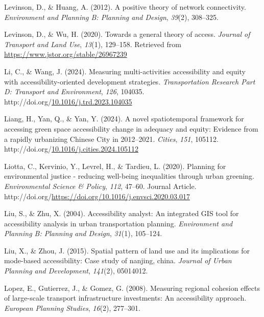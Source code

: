 \documentclass[
11pt, %
oneside, %
english, %
singlespacing, %
]{macthesis} %
\newlength{\cslhangindent}
\newenvironment{CSLReferences}[2] %
{\begin{list}{}{%
	\setlength{\itemindent}{0pt}
	\setlength{\leftmargin}{0pt}
	\setlength{\parsep}{0pt}
	\ifodd #1
	\setlength{\leftmargin}{\cslhangindent}
	\setlength{\itemindent}{-1\cslhangindent}
	\fi
	\setlength{\itemsep}{#2\baselineskip}}}
{\end{list}}
\begin{document}
\begin{CSLReferences}{1}{0}
Levinson, D., \& Huang, A. (2012). A positive theory of network connectivity. \emph{Environment and Planning B: Planning and Design}, \emph{39}(2), 308--325.

Levinson, D., \& Wu, H. (2020). Towards a general theory of access. \emph{Journal of Transport and Land Use}, \emph{13}(1), 129--158. Retrieved from \url{https://www.jstor.org/stable/26967239}

Li, C., \& Wang, J. (2024). Measuring multi-activities accessibility and equity with accessibility-oriented development strategies. \emph{Transportation Research Part D: Transport and Environment}, \emph{126}, 104035. http://doi.org/\href{https://doi.org/10.1016/j.trd.2023.104035}{10.1016/j.trd.2023.104035}

Liang, H., Yan, Q., \& Yan, Y. (2024). A novel spatiotemporal framework for accessing green space accessibility change in adequacy and equity: {Evidence} from a rapidly urbanizing {Chinese} {City} in 2012--2021. \emph{Cities}, \emph{151}, 105112. http://doi.org/\href{https://doi.org/10.1016/j.cities.2024.105112}{10.1016/j.cities.2024.105112}

Liotta, C., Kervinio, Y., Levrel, H., \& Tardieu, L. (2020). Planning for environmental justice - reducing well-being inequalities through urban greening. \emph{Environmental Science \& Policy}, \emph{112}, 47--60. Journal Article. http://doi.org/\url{https://doi.org/10.1016/j.envsci.2020.03.017}

Liu, S., \& Zhu, X. (2004). Accessibility analyst: An integrated GIS tool for accessibility analysis in urban transportation planning. \emph{Environment and Planning B: Planning and Design}, \emph{31}(1), 105--124.

Liu, X., \& Zhou, J. (2015). Spatial pattern of land use and its implications for mode-based accessibility: Case study of nanjing, china. \emph{Journal of Urban Planning and Development}, \emph{141}(2), 05014012.

Lopez, E., Gutierrez, J., \& Gomez, G. (2008). Measuring regional cohesion effects of large-scale transport infrastructure investments: {An} accessibility approach. \emph{European Planning Studies}, \emph{16}(2), 277--301.


\end{CSLReferences}
\end{document}
